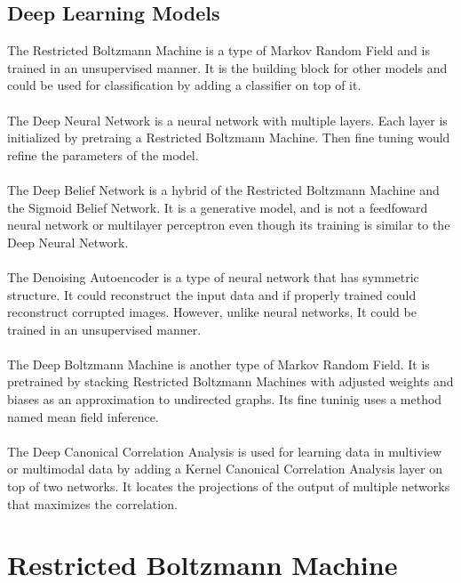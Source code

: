 \documentclass[12pt]{article}
\begin{document}
\subsection{Deep Learning Models}
The Restricted Boltzmann Machine is a type of Markov Random Field and is trained in an unsupervised manner. It is the building block for other models and could be used for classification by adding a classifier on top of it.\\
\\
The Deep Neural Network is a neural network with multiple layers. Each layer is initialized by pretraing a Restricted Boltzmann Machine. Then fine tuning would refine the parameters of the model.\\
\\
The Deep Belief Network is a hybrid of the Restricted Boltzmann Machine and the Sigmoid Belief Network. It is a generative model, and is not a feedfoward neural network or multilayer perceptron even though its training is similar to the Deep Neural Network.\\
\\
The Denoising Autoencoder is a type of neural network that has symmetric structure. It could reconstruct the input data and if properly trained could reconstruct corrupted images. However, unlike neural networks, It could be trained in an unsupervised manner.\\
\\
The Deep Boltzmann Machine is another type of Markov Random Field. It is pretrained by stacking Restricted Boltzmann Machines with adjusted weights and biases as an approximation to undirected graphs. Its fine tuninig uses a method named mean field inference.\\
\\
The Deep Canonical Correlation Analysis is used for learning data in multiview or multimodal data by adding a Kernel Canonical Correlation Analysis layer on top of two networks. It locates the projections of the output of multiple networks that maximizes the correlation.

\clearpage
\section{Restricted Boltzmann Machine}
\end{document}
